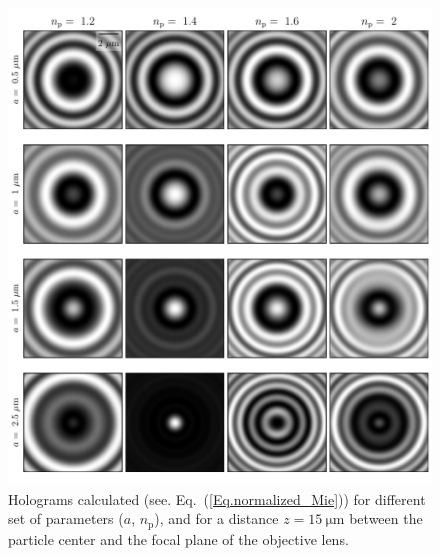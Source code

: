 \begin{figure}
	\centering
	\includegraphics{02_body/chapter2/images/holo_size_exemple/holos_fix_z.pdf}
	\caption{Holograms calculated (see. Eq.~(\ref{Eq.normalized_Mie})) for different set of parameters ($a$, $n_\mathrm{p}$), and for a distance $z = 15 ~\mathrm{\mu m}$ between the particle center and the focal plane of the objective lens.~\href{https://github.com/eXpensia/Confined-Brownian-Motion/blob/main/02_body/chapter2/images/holo_size_exemple/holosize_variation.ipynb}{\faGithub}}
	\label{fig:holo_fix_z}
\end{figure}



